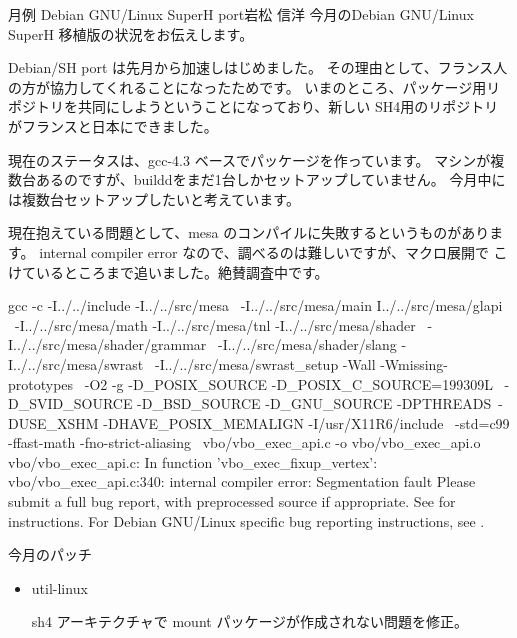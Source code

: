 \documentclass[mingoth,a4paper]{jsarticle}
\begin{document}
\begin{getsureiupdate}{月例 Debian GNU/Linux SuperH port}{岩松 信洋}
今月のDebian GNU/Linux SuperH 移植版の状況をお伝えします。

Debian/SH port は先月から加速しはじめました。
その理由として、フランス人の方が協力してくれることになったためです。
いまのところ、パッケージ用リポジトリを共同にしようということになっており、新しい
SH4用のリポジトリがフランスと日本にできました。

現在のステータスは、gcc-4.3 ベースでパッケージを作っています。
マシンが複数台あるのですが、builddをまだ1台しかセットアップしていません。
今月中には複数台セットアップしたいと考えています。

現在抱えている問題として、mesa のコンパイルに失敗するというものがありま
 す。
internal compiler error なので、調べるのは難しいですが、マクロ展開で
こけているところまで追いました。絶賛調査中です。

\begin{commandline}
gcc -c -I../../include -I../../src/mesa \
-I../../src/mesa/main \-I../../src/mesa/glapi \
-I../../src/mesa/math -I../../src/mesa/tnl 
-I../../src/mesa/shader \
-I../../src/mesa/shader/grammar \
-I../../src/mesa/shader/slang -I../../src/mesa/swrast \
-I../../src/mesa/swrast_setup -Wall -Wmissing-prototypes \
-O2 -g   -D_POSIX_SOURCE -D_POSIX_C_SOURCE=199309L \
-D_SVID_SOURCE -D_BSD_SOURCE -D_GNU_SOURCE -DPTHREADS\
 -DUSE_XSHM -DHAVE_POSIX_MEMALIGN  -I/usr/X11R6/include \
-std=c99 -ffast-math  -fno-strict-aliasing \
vbo/vbo_exec_api.c -o vbo/vbo_exec_api.o
vbo/vbo_exec_api.c: In function 'vbo_exec_fixup_vertex':
 vbo/vbo_exec_api.c:340: internal compiler error: Segmentation fault
 Please submit a full bug report,
with preprocessed source if appropriate.
See  for instructions.
 For Debian GNU/Linux specific bug reporting instructions,
 see .
\end{commandline}

今月のパッチ
\begin{itemize}
\item util-linux

sh4 アーキテクチャで mount パッケージが作成されない問題を修正。
\end{itemize}
\end{getsureiupdate}
\end{document}
